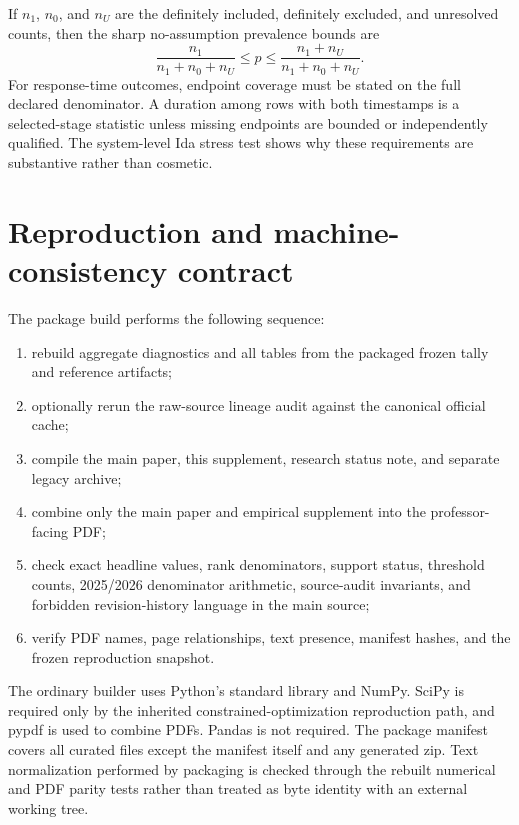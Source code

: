 \documentclass[11pt]{article}
\begin{document}
If $n_1$, $n_0$, and $n_U$ are the definitely included, definitely excluded, and unresolved counts, then the sharp no-assumption prevalence bounds are
\begin{equation}
\frac{n_1}{n_1+n_0+n_U}
\le p\le
\frac{n_1+n_U}{n_1+n_0+n_U}.
\end{equation}
For response-time outcomes, endpoint coverage must be stated on the full declared denominator. A duration among rows with both timestamps is a selected-stage statistic unless missing endpoints are bounded or independently qualified. The system-level Ida stress test shows why these requirements are substantive rather than cosmetic.

\section{Reproduction and machine-consistency contract}

The package build performs the following sequence:
\begin{enumerate}
\item rebuild aggregate diagnostics and all tables from the packaged frozen tally and reference artifacts;
\item optionally rerun the raw-source lineage audit against the canonical official cache;
\item compile the main paper, this supplement, research status note, and separate legacy archive;
\item combine only the main paper and empirical supplement into the professor-facing PDF;
\item check exact headline values, rank denominators, support status, threshold counts, 2025/2026 denominator arithmetic, source-audit invariants, and forbidden revision-history language in the main source;
\item verify PDF names, page relationships, text presence, manifest hashes, and the frozen reproduction snapshot.
\end{enumerate}

The ordinary builder uses Python's standard library and NumPy. SciPy is required only by the inherited constrained-optimization reproduction path, and pypdf is used to combine PDFs. Pandas is not required. The package manifest covers all curated files except the manifest itself and any generated zip. Text normalization performed by packaging is checked through the rebuilt numerical and PDF parity tests rather than treated as byte identity with an external working tree.
\end{document}
